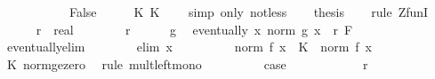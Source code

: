\begin{isabellebody}
\ \ \ \ \isamarkupfalse%
\isanewline
\ \ \isamarkupfalse%
\isanewline
{}\isamarkupfalse%
\isanewline
\ \ \isamarkupfalse%
\ False\isanewline
\ \ \isamarkupfalse%
\ \isamarkupfalse%
\ K{\isacharcolon}{\kern0pt}\ {\isachardoublequoteopen}K\ {\isasymle}\ {}{\isachardoublequoteclose}\ \isamarkupfalse%
\ {\isacharparenleft}{\kern0pt}simp\ only{\isacharcolon}{\kern0pt}\ not{\isacharunderscore}{\kern0pt}less{\isacharparenright}{\kern0pt}\isanewline
\ \ \isamarkupfalse%
\ {\isacharquery}{\kern0pt}thesis\isanewline
\ \ \isamarkupfalse%
\ {\isacharparenleft}{\kern0pt}rule\ ZfunI{\isacharparenright}{\kern0pt}\isanewline
\ \ \ \ \isamarkupfalse%
\ r\ {\isacharcolon}{\kern0pt}{\isacharcolon}{\kern0pt}\ real\isanewline
\ \ \ \ \isamarkupfalse%
\ {\isachardoublequoteopen}{}\ {\isacharless}{\kern0pt}\ r{\isachardoublequoteclose}\isanewline
\ \ \ \ \isamarkupfalse%
\ g\ \isamarkupfalse%
\ {\isachardoublequoteopen}eventually\ {\isacharparenleft}{\kern0pt}{\isasymlambda}x{\isachardot}{\kern0pt}\ norm\ {\isacharparenleft}{\kern0pt}g\ x{\isacharparenright}{\kern0pt}\ {\isacharless}{\kern0pt}\ r{\isacharparenright}{\kern0pt}\ F{\isachardoublequoteclose}\isanewline
\ \ \ \ \isamarkupfalse%
\ eventually{\isacharunderscore}{\kern0pt}elim\isanewline
\ \ \ \ \ \ \isamarkupfalse%
\ {\isacharparenleft}{\kern0pt}elim\ x{\isacharparenright}{\kern0pt}\isanewline
\ \ \ \ \ \ \isamarkupfalse%
\ \isamarkupfalse%
\ {\isachardoublequoteopen}norm\ {\isacharparenleft}{\kern0pt}f\ x{\isacharparenright}{\kern0pt}\ {\isacharasterisk}{\kern0pt}\ K\ {\isasymle}\ norm\ {\isacharparenleft}{\kern0pt}f\ x{\isacharparenright}{\kern0pt}\ {\isacharasterisk}{\kern0pt}\ {}{\isachardoublequoteclose}\isanewline
\ \ \ \ \ \ \ \ \isamarkupfalse%
\ K\ norm{\isacharunderscore}{\kern0pt}ge{\isacharunderscore}{\kern0pt}zero\ \isamarkupfalse%
\ {\isacharparenleft}{\kern0pt}rule\ mult{\isacharunderscore}{\kern0pt}left{\isacharunderscore}{\kern0pt}mono{\isacharparenright}{\kern0pt}\isanewline
\ \ \ \ \ \ \isamarkupfalse%
\ \isamarkupfalse%
\ {\isacharquery}{\kern0pt}case\isanewline
\ \ \ \ \ \ \ \ \isamarkupfalse%
\ {\isacartoucheopen}{}\ {\isacharless}{\kern0pt}\ r{\isacartoucheclose}\ \isamarkupfalse%

\end{isabellebody}
